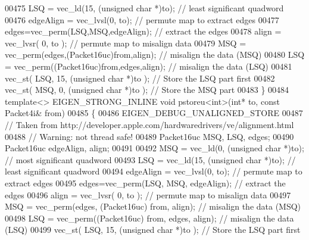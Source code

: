 \begin{DoxyCode}
{00475   LSQ = vec\_ld(15, (\textcolor{keywordtype}{unsigned} \textcolor{keywordtype}{char} *)to);                    \textcolor{comment}{// least significant quadword}
00476   edgeAlign = vec\_lvsl(0, to);                              \textcolor{comment}{// permute map to extract edges}
00477   edges=vec\_perm(LSQ,MSQ,edgeAlign);                        \textcolor{comment}{// extract the edges}
00478   align = vec\_lvsr( 0, to );                                \textcolor{comment}{// permute map to misalign data}
00479   MSQ = vec\_perm(edges,(Packet16uc)from,align);             \textcolor{comment}{// misalign the data (MSQ)}
00480   LSQ = vec\_perm((Packet16uc)from,edges,align);             \textcolor{comment}{// misalign the data (LSQ)}
00481   vec\_st( LSQ, 15, (\textcolor{keywordtype}{unsigned} \textcolor{keywordtype}{char} *)to );                   \textcolor{comment}{// Store the LSQ part first}
00482   vec\_st( MSQ, 0, (\textcolor{keywordtype}{unsigned} \textcolor{keywordtype}{char} *)to );                    \textcolor{comment}{// Store the MSQ part}
00483 \}
00484 \textcolor{keyword}{template}<> EIGEN\_STRONG\_INLINE \textcolor{keywordtype}{void} pstoreu<int>(\textcolor{keywordtype}{int}*      to, \textcolor{keyword}{const} Packet4i& from)
00485 \{
00486   EIGEN\_DEBUG\_UNALIGNED\_STORE
00487   \textcolor{comment}{// Taken from http://developer.apple.com/hardwaredrivers/ve/alignment.html}
00488   \textcolor{comment}{// Warning: not thread safe!}
00489   Packet16uc MSQ, LSQ, edges;
00490   Packet16uc edgeAlign, align;
00491 
00492   MSQ = vec\_ld(0, (\textcolor{keywordtype}{unsigned} \textcolor{keywordtype}{char} *)to);                     \textcolor{comment}{// most significant quadword}
00493   LSQ = vec\_ld(15, (\textcolor{keywordtype}{unsigned} \textcolor{keywordtype}{char} *)to);                    \textcolor{comment}{// least significant quadword}
00494   edgeAlign = vec\_lvsl(0, to);                              \textcolor{comment}{// permute map to extract edges}
00495   edges=vec\_perm(LSQ, MSQ, edgeAlign);                      \textcolor{comment}{// extract the edges}
00496   align = vec\_lvsr( 0, to );                                \textcolor{comment}{// permute map to misalign data}
00497   MSQ = vec\_perm(edges, (Packet16uc) from, align);          \textcolor{comment}{// misalign the data (MSQ)}
00498   LSQ = vec\_perm((Packet16uc) from, edges, align);          \textcolor{comment}{// misalign the data (LSQ)}
00499   vec\_st( LSQ, 15, (\textcolor{keywordtype}{unsigned} \textcolor{keywordtype}{char} *)to );                   \textcolor{comment}{// Store the LSQ part first}
}
\end{DoxyCode}
